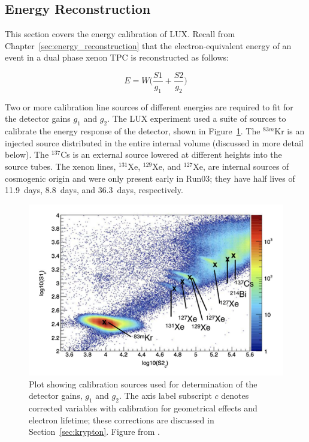 \subsection{Energy Reconstruction}
This section covers the energy calibration of \ac{LUX}. Recall from Chapter~\ref{sec:energy_reconstruction} that the electron-equivalent energy of an event in a dual phase xenon \ac{TPC} is reconstructed as follows:

\begin{equation}
E = W \Big(\frac{S1}{g_{1}} + \frac{S2}{g_{2}}\Big)
\end{equation}

Two or more calibration line sources of different energies are required to fit for the detector gains $g_{1}$ and $g_{2}$. The \ac{LUX} experiment used a suite of sources to calibrate the energy response of the detector, shown in Figure~\ref{fig:calib_sources}. The $^{83m}$Kr is an injected source distributed in the entire internal volume (discussed in more detail below). The $^{137}$Cs is an external source lowered at different heights into the source tubes. The xenon lines, $^{131}$Xe, $^{129}$Xe, and $^{127}$Xe, are internal sources of cosmogenic origin and were only present early in Run03; they have half lives of 11.9~days, 8.8~days, and 36.3~days, respectively. 

\begin{figure}[htbp]
\begin{center}
\includegraphics[width=\textwidth]{figures/lux/calibration_sources.png}
\caption{Plot showing calibration sources used for determination of the detector gains, $g_{1}$ and $g_{2}$. The axis label subscript $c$ denotes corrected variables with calibration for geometrical effects and electron lifetime; these corrections are discussed in Section~\ref{sec:krypton}. Figure from \cite{LUX:Run03Comprehensive}.}
\label{fig:calib_sources}
\end{center}
\end{figure}


